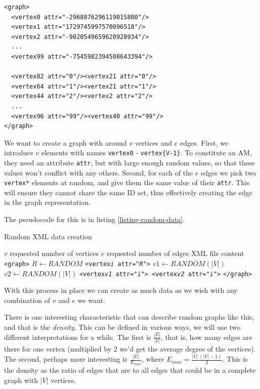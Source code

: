 \begin{scriptsize}
\begin{verbatim}
<graph>
  <vertex0 attr="-2968876296119015800"/>
  <vertex1 attr="1729745997570096518"/>
  <vertex2 attr="-9020549659620928934"/>
  ...
  <vertex99 attr="-7545982394508643394"/>

  <vertex82 attr="0"/><vertex21 attr="0"/>
  <vertex64 attr="1"/><vertex21 attr="1"/>
  <vertex44 attr="2"/><vertex2 attr="2"/>
  ...
  <vertex96 attr="99"/><vertex40 attr="99"/>
</graph>
\end{verbatim}
\end{scriptsize}

We want to create a graph with around $v$ vertices and $e$ edges. First, we introduce $v$ elements with names \texttt{vertex0} - \texttt{vertex\{V-1\}}. To constitute an AM, they need an attribute \texttt{attr}, but with large enough random values, so that these values won't conflict with any others. Second, for each of the $e$ edges we pick two \texttt{vertex*} elements at random, and give them the same value of their \texttt{attr}. This will ensure they cannot share the same ID set, thus effectively creating the edge in the graph representation.

The pseudocode for this is in listing \ref{listing-random-data}.

\begin{algorithm}
\caption{Random XML data creation}
\label{listing-random-data}
\begin{algorithmic}
\REQUIRE $v$ requested number of vertices
\REQUIRE $e$ requested number of edges
\ENSURE XML file content
\PRINT \texttt{<graph>}
	\STATE $R \gets RANDOM$
	\PRINT \texttt{<vertex\textit{i} attr="\textit{R}">}
\ENDFOR
{}
	\STATE $v1 \gets RANDOM(|V|)$
	\STATE $v2 \gets RANDOM(|V|)$
	\PRINT \texttt{<vertex\textit{v1} attr="\textit{i}"> <vertex\textit{v2} attr="\textit{i}">}
\ENDFOR
\PRINT \texttt{</graph>}
\RETURN
\end{algorithmic}
\end{algorithm}

With this process in place we can create as much data as we wish with any combination of $v$ and $e$ we want.

There is one interesting characteristic that can describe random graphs like this, and that is the \textit{density}. This can be defined in various ways, we will use two different interpretations for a while. The first is $\frac{|E|}{|V|}$, that is, how many edges are there for one vertex (multiplied by 2 we'd get the average degree of the vertices). The second, perhaps more interesting is $\frac{|E|}{E_{max}}$, where $E_{max} = \frac{|V|.(|V|-1)}{2}$. This is the density as the ratio of edges that are to all edges that could be in a complete graph with $|V|$ vertices.

